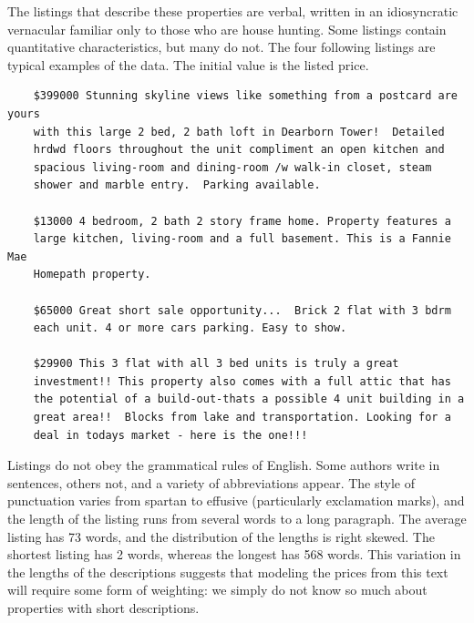 \documentclass[10pt]{article}
\begin{document}
 The listings that describe these properties are verbal, written in an
 idiosyncratic vernacular familiar only to those who are house hunting.  Some
 listings contain quantitative characteristics, but many do not.  The four
 following listings are typical examples of the data.  The initial value is the
 listed price.

 \begin{verbatim}
    $399000 Stunning skyline views like something from a postcard are yours
    with this large 2 bed, 2 bath loft in Dearborn Tower!  Detailed
    hrdwd floors throughout the unit compliment an open kitchen and
    spacious living-room and dining-room /w walk-in closet, steam
    shower and marble entry.  Parking available. 

    $13000 4 bedroom, 2 bath 2 story frame home. Property features a
    large kitchen, living-room and a full basement. This is a Fannie Mae
    Homepath property. 

    $65000 Great short sale opportunity...  Brick 2 flat with 3 bdrm
    each unit. 4 or more cars parking. Easy to show. 

    $29900 This 3 flat with all 3 bed units is truly a great
    investment!! This property also comes with a full attic that has
    the potential of a build-out-thats a possible 4 unit building in a 
    great area!!  Blocks from lake and transportation. Looking for a
    deal in todays market - here is the one!!! 
 \end{verbatim}

 \noindent
 Listings do not obey the grammatical rules of English.  Some authors write in
 sentences, others not, and a variety of abbreviations appear.  The style of
 punctuation varies from spartan to effusive (particularly exclamation marks),
 and the length of the listing runs from several words to a long paragraph.  The
 average listing has 73 words, and the distribution of the lengths is right
 skewed.  The shortest listing has 2 words, whereas the longest has 568 words.
  This variation in the lengths of the descriptions suggests that modeling the
 prices from this text will require some form of weighting: we simply do not
 know so much about properties with short descriptions.
\end{document}
